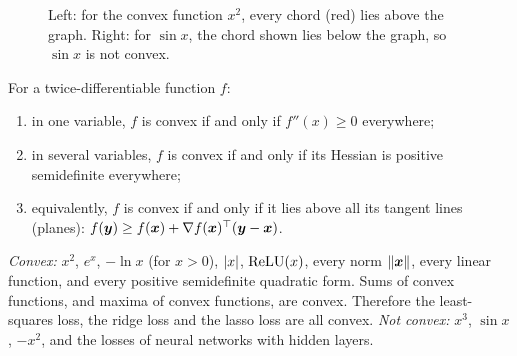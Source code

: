 \begin{figure}[htbp]
\centering
{}
\caption{Left: for the convex function $x^2$, every chord (red) lies above the
  graph. Right: for $\sin x$, the chord shown lies below the graph, so $\sin x$ is
  not convex.}
\label{fig:convex-function}
\end{figure}

\begin{theorem}\label{thm:convexity-tests}
For a twice-differentiable function $f$:
\begin{enumerate}
  \item in one variable, $f$ is convex if and only if $f''(x) \ge 0$ everywhere;
  \item in several variables, $f$ is convex if and only if its Hessian is
    positive semidefinite everywhere;
  \item equivalently, $f$ is convex if and only if it lies above all its tangent
    lines (planes): $f(\bm{y}) \ge f(\bm{x}) + \nabla f(\bm{x})^\top(\bm{y} - \bm{x})$.
\end{enumerate}
\end{theorem}

\begin{example}
\emph{Convex:} $x^2$, $e^x$, $-\ln x$ (for $x > 0$), $\lvert x\rvert$, $\operatorname{ReLU}(x)$, every
norm $\lVert\bm{x}\rVert$, every linear function, and every positive semidefinite
quadratic form. Sums of convex functions, and maxima of convex functions, are
convex. Therefore the least-squares loss, the ridge loss and the lasso loss are
all convex. \emph{Not convex:} $x^3$, $\sin x$, $-x^2$, and the losses of neural
networks with hidden layers.
\end{example}

